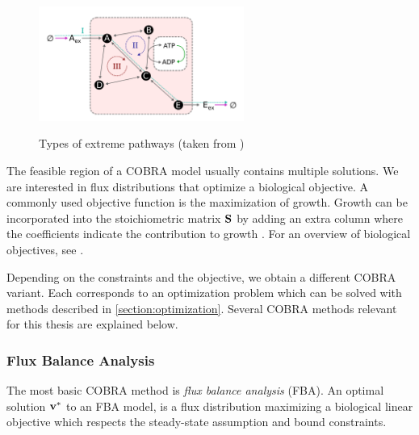 \begin{figure}[h!]
    \caption{Types of extreme pathways (taken from \cite{noor_removing_2018})}
    \centering
    \includegraphics[width=0.6\textwidth]{Images/extreme_pathways.png}
    \label{fig:extreme_pathways}
\end{figure}

The feasible region of a COBRA model usually contains multiple solutions. We are interested in flux distributions that optimize a biological objective. A commonly used objective function is the maximization of growth. Growth can be incorporated into the stoichiometric matrix $\bold S$ by adding an extra column where the coefficients indicate the contribution to growth \cite{FBA}. For an overview of biological objectives, see \cite{palsson_systems_biology}.

Depending on the constraints and the objective, we obtain a different COBRA variant. Each corresponds to an optimization problem which can be solved with methods described in \cref{section:optimization}. Several COBRA methods relevant for this thesis are explained below.

\subsubsection{Flux Balance Analysis} \label{section:fba}
The most basic COBRA method is \textit{flux balance analysis} (FBA). An optimal solution $\bold v^*$ to an FBA model, is a flux distribution maximizing a biological linear objective which respects the steady-state assumption and bound constraints.


